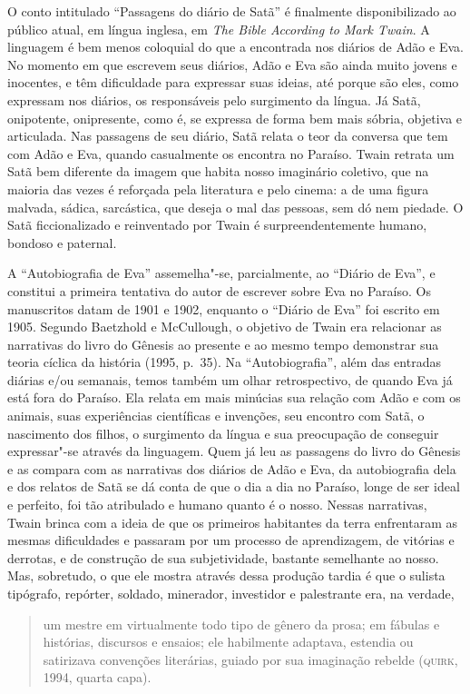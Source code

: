 O conto intitulado ``Passagens do diário de
Satã'' é finalmente disponibilizado ao público atual, em
língua inglesa, em \textit{The Bible According to Mark Twain}.
A linguagem é bem menos coloquial do que a encontrada nos diários de Adão e
Eva. No momento em que escrevem seus diários, Adão e Eva são ainda muito jovens e
inocentes, e têm dificuldade para expressar suas ideias, até porque são
eles, como expressam nos diários, os responsáveis pelo surgimento da
língua. Já Satã, onipotente, onipresente, como é, se
expressa de forma bem mais sóbria, objetiva e articulada. Nas passagens de
seu diário, Satã relata o teor da conversa que tem com Adão e Eva, quando
casualmente os encontra no Paraíso. Twain retrata um Satã bem
diferente da imagem que habita nosso imaginário coletivo, que na maioria
das vezes é reforçada pela literatura e pelo cinema: a de uma figura
malvada, sádica, sarcástica, que deseja o mal das pessoas, sem dó nem
piedade. O Satã ficcionalizado e reinventado por Twain é
surpreendentemente humano, bondoso e paternal.

A ``Autobiografia de Eva'' assemelha"-se,
parcialmente, ao ``Diário de Eva'', e
constitui a primeira tentativa do autor de escrever sobre Eva no
Paraíso. Os manuscritos datam de 1901 e 1902, enquanto o
``Diário de Eva'' foi escrito em 1905. Segundo
Baetzhold e McCullough, o objetivo de Twain era relacionar as narrativas do
livro do Gênesis ao presente e ao mesmo tempo demonstrar sua teoria
cíclica da história (1995, p.~35). Na “Autobiografia”, além das entradas
diárias e/ou semanais, temos também um olhar retrospectivo, de quando Eva
já está fora do Paraíso. Ela relata em mais minúcias sua relação com Adão
e com os animais, suas experiências científicas e invenções, seu encontro
com Satã, o nascimento dos filhos, o surgimento da língua e sua
preocupação de conseguir expressar"-se através da linguagem. Quem já leu as
passagens do livro do Gênesis e as compara com as narrativas dos diários
de Adão e Eva, da autobiografia dela e dos relatos de Satã se dá conta de que
o dia a dia no Paraíso, longe de ser ideal e perfeito, foi tão atribulado e
humano quanto é o nosso. Nessas narrativas, Twain brinca com a
ideia de que os primeiros habitantes da terra enfrentaram as mesmas
dificuldades e passaram por um processo de aprendizagem, de vitórias e
derrotas, e de construção de sua subjetividade, bastante semelhante ao
nosso. Mas, sobretudo, o que ele mostra através dessa produção tardia é
que o sulista tipógrafo, repórter, soldado, minerador, investidor e
palestrante era, na verdade,

\begin{quote}
um mestre em virtualmente todo
tipo de gênero da prosa; em fábulas e histórias, discursos e ensaios; ele
habilmente adaptava, estendia ou satirizava convenções literárias, guiado
por sua imaginação rebelde (\textsc{quirk}, 1994, quarta capa). 
\end{quote}



